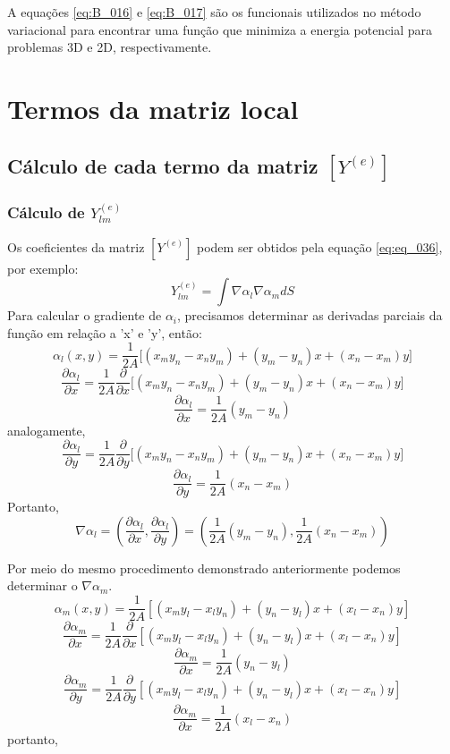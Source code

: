 \documentclass[
12pt,
a4paper,
oneside,
chapter=TITLE,
sumario=tradicional
]{abntex2}
\begin{document}
A equações \ref{eq:B_016} e \ref{eq:B_017} são os funcionais utilizados no método variacional para encontrar uma função que minimiza a energia potencial para problemas 3D e 2D, respectivamente.

\chapter{Termos da matriz local} \label{App:MatrizLocal}
\section*{Cálculo de cada termo da matriz $[Y^{(e)}]$}

\subsection*{ Cálculo de $Y_{lm}^{(e)}$}
Os coeficientes da matriz $[Y^{(e)}]$ podem ser obtidos pela equação \ref{eq:eq_036}, por exemplo:
$$ 
\boxed{Y_{lm}^{(e)} = \int \nabla \alpha_l \nabla \alpha_m dS}
$$
Para calcular o gradiente de $\alpha_i$, precisamos determinar as derivadas parciais da função em relação a ’x’ e ’y’, então:
$$
\alpha_l(x,y) = \frac{1}{2A}\Big[ (x_m y_n - x_n y_m) + (y_m - y_n)x + (x_n - x_m)y \Big]
$$
$$
\frac{\partial \alpha_l}{\partial x} = \frac{1}{2A}\frac{\partial}{\partial x}\Big[ (x_m y_n - x_n y_m) + (y_m - y_n)x + (x_n - x_m)y \Big]
$$
$$
\boxed{\frac{\partial \alpha_l}{\partial x} = \frac{1}{2A}(y_m - y_n)}
$$
analogamente,
$$
\frac{\partial \alpha_l}{\partial y} = \frac{1}{2A}\frac{\partial}{\partial y}\Big[ (x_m y_n - x_n y_m) + (y_m - y_n)x + (x_n - x_m)y \Big]
$$
$$
\boxed{\frac{\partial \alpha_l}{\partial y} = \frac{1}{2A}(x_n - x_m)}
$$
Portanto,
$$
\boxed{\nabla \alpha_l = \left( \frac{\partial \alpha_l}{\partial x}, \frac{\partial \alpha_l}{\partial y} \right)
	= \left( \frac{1}{2A}(y_m - y_n), \frac{1}{2A}(x_n - x_m) \right)}
$$


Por meio do mesmo procedimento demonstrado anteriormente podemos determinar o $\nabla \alpha_m$.
$$
\alpha_m(x,y) = \frac{1}{2A} \left[ (x_m y_l - x_l y_n) + (y_n - y_l)x + (x_l - x_n)y \right] 
$$
$$
\frac{\partial \alpha_m}{\partial x} = \frac{1}{2A}\frac{\partial}{\partial x}\left[ (x_m y_l - x_l y_n) + (y_n - y_l)x + (x_l - x_n)y \right] 
$$
$$
\boxed{\frac{\partial \alpha_m}{\partial x} = \frac{1}{2A}(y_n - y_l)}
$$
$$
\frac{\partial \alpha_m}{\partial y} = \frac{1}{2A}\frac{\partial}{\partial y}\left[ (x_m y_l - x_l y_n) + (y_n - y_l)x + (x_l - x_n)y \right] 
$$
$$
\boxed{\frac{\partial \alpha_m}{\partial x} = \frac{1}{2A}(x_l - x_n)}
$$
portanto,
\end{document}
